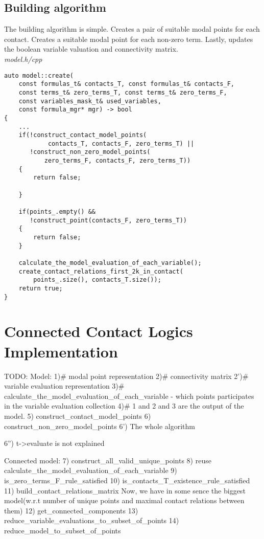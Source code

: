 \documentclass{article}
\begin{document}
	\newpage
	\subsection{Building algorithm}
	The building algorithm is simple. Creates a pair of suitable modal points for each contact. Creates a suitable modal point for each non-zero term. Lastly, updates the boolean variable valuation and connectivity matrix.
\\
\noindent
\textit{model.h/cpp}
\begin{lstlisting}
auto model::create(
	const formulas_t& contacts_T, const formulas_t& contacts_F,
	const terms_t& zero_terms_T, const terms_t& zero_terms_F,
	const variables_mask_t& used_variables,
	const formula_mgr* mgr) -> bool
{
    ...
    if(!construct_contact_model_points(
            contacts_T, contacts_F, zero_terms_T) ||
       !construct_non_zero_model_points(
           zero_terms_F, contacts_F, zero_terms_T))
    {
        return false;

    }

    if(points_.empty() &&
       !construct_point(contacts_F, zero_terms_T))
    {
        return false;
    }

    calculate_the_model_evaluation_of_each_variable();
    create_contact_relations_first_2k_in_contact(
        points_.size(), contacts_T.size());
    return true;
}
\end{lstlisting}

	\newpage
	\section{Connected Contact Logics Implementation}

	\iffalse
	TODO:
	Model:
	1)# modal point representation
	2)# connectivity matrix
	2')# variable evaluation representation
	3)# calculate_the_model_evaluation_of_each_variable - which points participates in the variable evaluation collection
	4)# 1 and 2 and 3 are the output of the model.
	5) construct_contact_model_points
	6) construct_non_zero_model_points
	6') The whole algorithm

	6'') t->evaluate is not explained

	Connected model:
	7) construct_all_valid_unique_points
	8) reuse calculate_the_model_evaluation_of_each_variable
	9) is_zero_terms_F_rule_satisfied
	10) is_contacts_T_existence_rule_satisfied
	11) build_contact_relations_matrix
    Now, we have in some sence the biggest model(w.r.t number of unique points and maximal contact relations between them)
    12) get_connected_components
    13) reduce_variable_evaluations_to_subset_of_points
    14) reduce_model_to_subset_of_points
\end{document}
